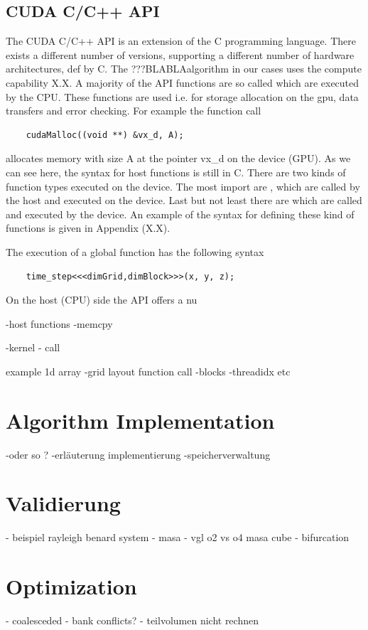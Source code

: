 \subsection{CUDA C/C++ API}

The CUDA C/C++ API is an extension of the C programming language.
There exists a different number of versions, supporting a different number of hardware architectures, def by C.
The ???BLABLAalgorithm in our cases uses the compute capability X.X.
A majority of the API functions are so called   which are executed by the CPU.
These functions are used i.e. for storage allocation on the gpu, data transfers and error checking.
For example the function call
\begin{verbatim}
    cudaMalloc((void **) &vx_d, A);
\end{verbatim}
allocates memory with size A at the pointer vx\_d on the device (GPU). As we can see here, the syntax for host functions is still in C.
There are two kinds of function types executed on the device.
The most import are , which are called by the host and executed on the device.
Last but not least there are  which are called and executed by the device.
An example of the syntax for defining these kind of functions is given in Appendix (X.X).


The execution of a global function has the following syntax

\begin{verbatim}
    time_step<<<dimGrid,dimBlock>>>(x, y, z);
\end{verbatim}






On the host (CPU) side the API offers a nu





-host functions
-memcpy

-kernel
-   call

example 1d array
-grid layout function call
-blocks
-threadidx etc

\section{Algorithm Implementation}
-oder so ?
-erläuterung  implementierung
-speicherverwaltung


\section{Validierung}
- beispiel rayleigh benard system
- masa
- vgl o2 vs o4 masa cube
- bifurcation

\section{Optimization}
- coalesceded
- bank conflicts?
- teilvolumen nicht rechnen

\newpage

